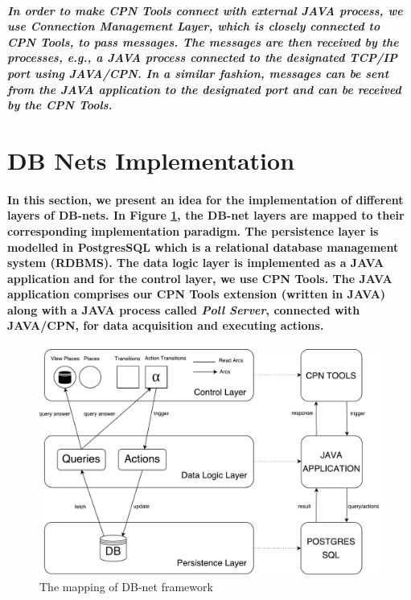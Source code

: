 \subparagraph*{\textnormal{In order to make CPN Tools connect with external JAVA process, we use Connection Management Layer, which is closely connected to CPN Tools, to pass messages. The messages are then received by the processes, e.g., a JAVA process connected to the designated TCP/IP port using JAVA/CPN. In a similar fashion, messages can be sent from the JAVA application to the designated port and can be received by the CPN Tools.}}

\section{DB Nets Implementation}
\label{sec:DBN_Impl_Implementation}
\paragraph*{\textnormal{In this section, we present an idea for the implementation of different layers of DB-nets. In Figure \ref{fig:DBN_Impl_Mapping_Framework}, the DB-net layers are mapped to their corresponding implementation paradigm. The persistence layer is modelled in PostgresSQL \cite{Postgres} which is a relational database management system (RDBMS). The data logic layer is implemented as a JAVA application and for the control layer, we use CPN Tools. The JAVA application comprises our CPN Tools extension (written in JAVA) along with a JAVA process called \textit{Poll Server}, connected with JAVA/CPN, for data acquisition and executing actions.}}

\begin{figure}[!htbp]
	\centering
	\includegraphics[scale = 0.35]{DBN_Impl_Mapping_Framework.pdf}
	\caption{The mapping of DB-net framework}
	\label{fig:DBN_Impl_Mapping_Framework}
\end{figure}

